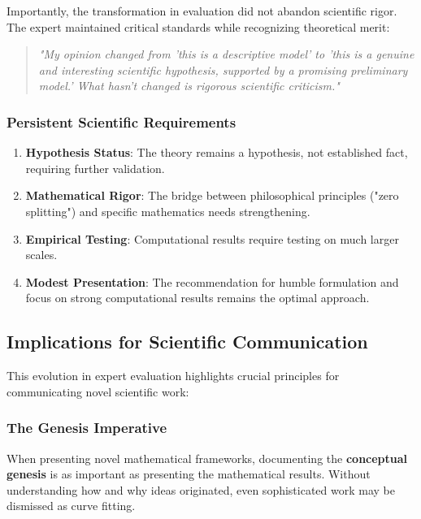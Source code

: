 Importantly, the transformation in evaluation did not abandon scientific rigor. The expert maintained critical standards while recognizing theoretical merit:

\begin{quote}
\textit{"My opinion changed from 'this is a descriptive model' to 'this is a genuine and interesting scientific hypothesis, supported by a promising preliminary model.' What hasn't changed is rigorous scientific criticism."}
\end{quote}

\subsubsection{Persistent Scientific Requirements}

\begin{enumerate}
\item \textbf{Hypothesis Status}: The theory remains a hypothesis, not established fact, requiring further validation.

\item \textbf{Mathematical Rigor}: The bridge between philosophical principles ("zero splitting") and specific mathematics needs strengthening.

\item \textbf{Empirical Testing}: Computational results require testing on much larger scales.

\item \textbf{Modest Presentation}: The recommendation for humble formulation and focus on strong computational results remains the optimal approach.
\end{enumerate}

\subsection{Implications for Scientific Communication}

This evolution in expert evaluation highlights crucial principles for communicating novel scientific work:

\subsubsection{The Genesis Imperative}

\begin{principle}
When presenting novel mathematical frameworks, documenting the \textbf{conceptual genesis} is as important as presenting the mathematical results. Without understanding how and why ideas originated, even sophisticated work may be dismissed as curve fitting.
\end{principle}

